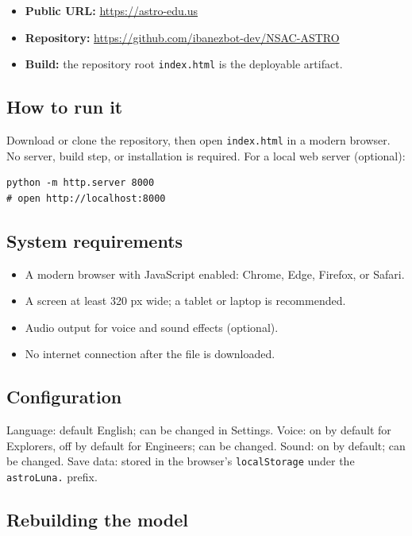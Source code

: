 \documentclass[11pt,a4paper]{article}
\newcommand{\code}[1]{\texttt{#1}}
\begin{document}
\begin{itemize}
  \item \textbf{Public URL:} \url{https://astro-edu.us}
  \item \textbf{Repository:} \url{https://github.com/ibanezbot-dev/NSAC-ASTRO}
  \item \textbf{Build:} the repository root \code{index.html} is the deployable artifact.
\end{itemize}

\subsection{How to run it}

Download or clone the repository, then open \code{index.html} in a modern browser. No server, build step, or installation is required. For a local web server (optional):

\begin{verbatim}
python -m http.server 8000
# open http://localhost:8000
\end{verbatim}

\subsection{System requirements}

\begin{itemize}
  \item A modern browser with JavaScript enabled: Chrome, Edge, Firefox, or Safari.
  \item A screen at least 320 px wide; a tablet or laptop is recommended.
  \item Audio output for voice and sound effects (optional).
  \item No internet connection after the file is downloaded.
\end{itemize}

\subsection{Configuration}

Language: default English; can be changed in Settings. Voice: on by default for Explorers, off by default for Engineers; can be changed. Sound: on by default; can be changed. Save data: stored in the browser's \code{localStorage} under the \code{astroLuna.} prefix.

\subsection{Rebuilding the model}
\end{document}
